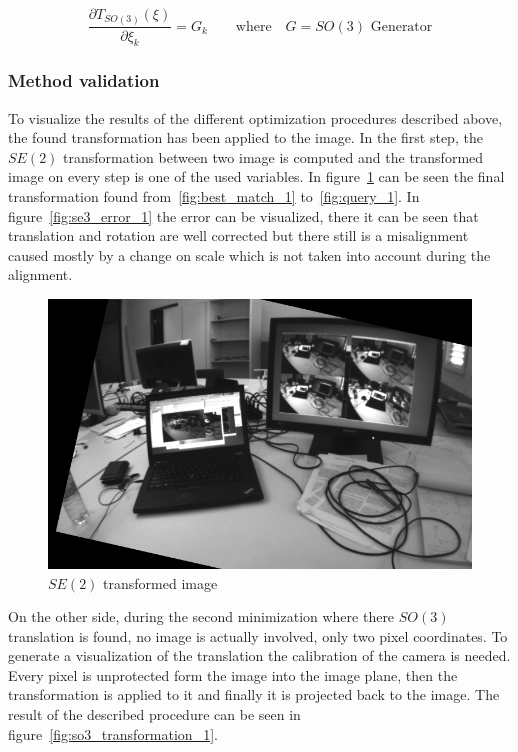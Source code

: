 \begin{equation}
  \frac{\partial T_{SO(3)}(\xi)}{\partial \xi_k}  = G_k \qquad \text{where} \quad G = \text{$SO(3)$ Generator}
\end{equation}


\subsubsection{Method validation}
\label{ssub:esm_method_validation}

To visualize the results of the different optimization procedures described above, the found transformation has been applied to the image. In the first step, the $SE(2)$ transformation between two image is computed and the transformed image on every step is one of the used variables. In figure~\ref{fig:se2_transformation_1} can be seen the final transformation found from~\ref{fig:best_match_1} to~\ref{fig:query_1}. In figure~\ref{fig:se3_error_1} the error can be visualized, there it can be seen that translation and rotation are well corrected but there still is a misalignment caused mostly by a change on scale which is not taken into account during the alignment.\\

\begin{figure}[htpb]
  \centering
  \includegraphics[width=0.6\linewidth]{img/se2_transformation_1.png}
  \caption{$SE(2)$ transformed image}
  \label{fig:se2_transformation_1}
\end{figure}

On the other side, during the second minimization where there $SO(3)$ translation is found, no image is actually involved, only two pixel coordinates. To generate a visualization of the translation the calibration of the camera is needed. Every pixel is unprotected form the image into the image plane, then the transformation is applied to it and finally it is projected back to the image. The result of the described procedure can be seen in figure~\ref{fig:so3_transformation_1}.\\

